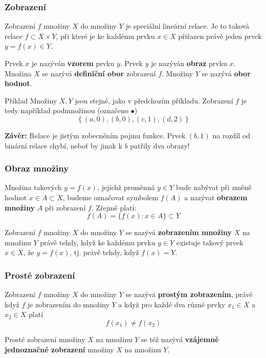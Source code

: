 	\subsubsection{Zobrazení}
	Zobrazení $f$ množiny $X$ do množiny $Y$ je speciální lineární relace. Je to taková relace $f\subset X\times Y$, při které je ke každému prvku $x\in X$ přiřazen právě jeden prvek $y=f(x)\in Y$.\br
	
	Prvek $x$ je nazýván \textbf{vzorem} prvku $y$. Prvek $y$ je nazýván \textbf{obraz} prvku $x$. Množina $X$ se nazývá \textbf{definiční obor} zobrazení $f$. Množiny $Y$ se nazývá \textbf{obor hodnot}.
	
	\begin{note}{Příklad}
	Množiny $X,Y$ jsou stejné, jako v předchozím příkladu. Zobrazení $f$ je tedy například podmnožinou (označeno $\bullet$)
	\[ \left\{ (a,0), (b,0), (c,1), (d,2)\right\} \]
	
	\begin{figure}
		
	\end{figure}
	
	\textbf{Závěr: } Relace je jistým zobecněním pojmu funkce. Prvek $(b,1)$ na rozdíl od binární relace chybí, neboť by jinak k $b$ patřily dva obrazy!
	\end{note}
	
	\subsubsection{Obraz množiny}
	Množina takových $y=f(x)$, jejichž proměnná $y\in Y$ bude nabývat při změně hodnot $x\in A\subset X$, budeme označovat symbolem $f(A)$ a nazývat \textbf{obrazem množiny} $A$ při zobrazení $f$. Zřejmě platí:
	\[ f(A)=\big\{f(x): x\in A\big\}\subset Y \]
	
	Zobrazení $f$ množiny $X$ do množiny $Y$ se nazývá \textbf{zobrazením množiny} $X$ na množinu $Y$ právě tehdy, když ke každému prvku $y\in Y$ existuje takový prvek $x\in X$, že $y=f(x)$, tj. právě tehdy, když $f(x)=Y$.
	
	\subsubsection{Prosté zobrazení}
	Zobrazení $f$ množiny $X$ do množiny $Y$ se nazývá \textbf{prostým zobrazením}, právě když $f$ je zobrazením do množiny $Y$ a když pro každé dva různé prvky $x_1\in X$ a $x_2\in X$ platí
	\[ f(x_1)\neq f(x_2) \]
	
	Prosté zobrazení množiny $X$ na množinu $Y$ se též nazývá \textbf{vzájemně jednoznačné zobrazení} množiny $X$ na množinu $Y$.
	
